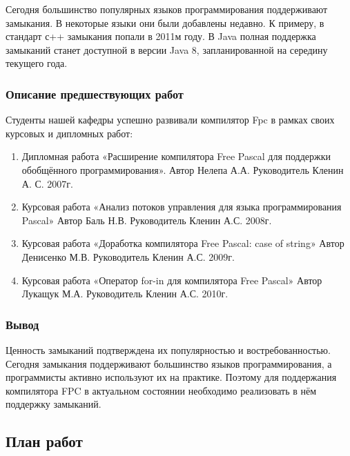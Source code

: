 \documentclass{imcs}
\begin{document}
Сегодня большинство популярных языков программирования поддерживают
замыкания. В некоторые языки они были добавлены недавно. К
примеру, в стандарт с++ замыкания попали в 2011м году. В Java
полная поддержка замыканий станет доступной в версии Java 8,
запланированной на середину текущего года.

\subsubsection{Описание предшествующих работ}
Студенты нашей кафедры успешно развивали компилятор Fpc в рамках своих
курсовых и дипломных работ:
\begin{enumerate}
    \item Дипломная работа «Расширение компилятора Free Pascal для поддержки обобщённого программирования». Автор Нелепа А.А. Руководитель Кленин А. С. 2007г.\cite{diplomnelepa}
    \item Курсовая работа «Анализ потоков управления для языка программирования Pascal» Автор Баль Н.В. Руководитель Кленин А.С. 2008г.\cite{coursebal}
    \item Курсовая работа «Доработка компилятора Free Pascal: case of string» Автор Денисенко М.В. Руководитель Кленин А.С. 2009г.\cite{misha}
    \item Курсовая работа «Оператор for-in для компилятора Free Pascal» Автор Лукащук М.А. Руководитель Кленин А.С. 2010г.\cite{courseluck}
\end{enumerate}

\subsubsection{Вывод}

Ценность замыканий подтверждена их популярностью и востребованностью. 
Сегодня замыкания поддерживают большинство языков программирования, а программисты 
активно используют их на практике. Поэтому для поддержания компилятора FPC в 
актуальном состоянии необходимо реализовать в нём поддержку замыканий.

\subsection{План работ}
\end{document}
